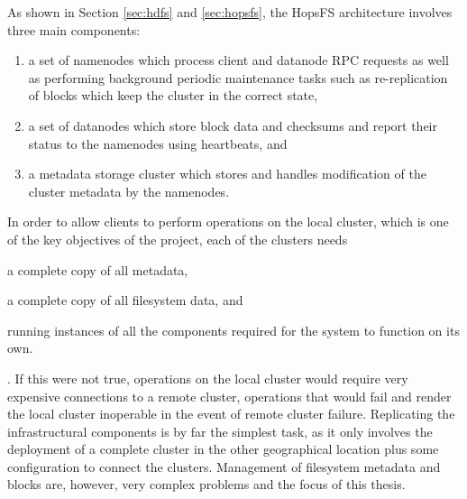 As shown in Section \ref{sec:hdfs} and \ref{sec:hopsfs}, the HopsFS architecture involves three main components:
\begin{enumerate}
    \item a set of namenodes which process client and datanode RPC requests as well as performing background periodic maintenance tasks such as re-replication of blocks which keep the cluster  in the correct state,
    \item a set of datanodes which store block data and checksums and report their status to the namenodes using heartbeats, and
    \item a metadata storage cluster which stores and handles modification of the cluster metadata by the namenodes.
\end{enumerate}
In order to allow clients to perform operations on the local cluster, which is one of the key objectives of the project, each of the clusters needs
\begin{inparaenum}
    \item a complete copy of all metadata,
    \item a complete copy of all filesystem data, and
    \item running instances of all the components required for the system to function on its own.
\end{inparaenum}.
If this were not true, operations on the local cluster would require very expensive connections to a remote cluster, operations that would fail and render the local cluster inoperable in the event of remote cluster failure.
Replicating the infrastructural components is by far the simplest task, as it only involves the deployment of a complete cluster in the other geographical location plus some configuration to connect the clusters.
Management of filesystem metadata and blocks are, however, very complex problems and the focus of this thesis.